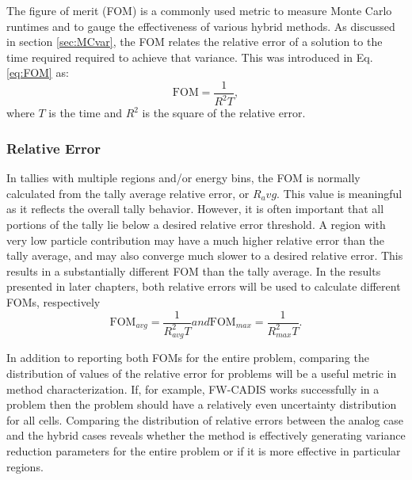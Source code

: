 The figure of merit (FOM) is a commonly used metric to measure Monte Carlo
runtimes and to gauge the effectiveness of various hybrid methods. As discussed
in section \ref{sec:MCvar}, the FOM relates the relative error of a solution to the
time required required to achieve that variance. This was introduced in Eq.
\ref{eq:FOM} as:
\begin{equation*}
  \text{FOM} = \frac{1}{R^{2}T} ,
\end{equation*}
where $T$ is the time and $R^{2}$ is the square of the relative error.

\subsubsection{Relative Error}

In tallies with multiple regions and/or energy bins, the FOM is normally calculated
from the tally average relative error, or $R_avg$. This value is meaningful as
it reflects the overall tally behavior. However, it is often important that all
portions of the tally lie below a desired relative error threshold. A region
with very low particle contribution may have a much higher relative error than
the tally average, and may also converge much slower to a desired relative
error. This results in a substantially different FOM than
the tally average. In the results presented in later chapters, both relative
errors will be used to calculate different FOMs, respectively
\begin{subequations}
  \begin{equation}
    \text{FOM}_{avg} = \frac{1}{R_{avg}^{2}T}
  \label{eq:FOMavg}
  \end{equation}
and
  \begin{equation}
    \text{FOM}_{max} = \frac{1}{R_{max}^{2}T} .
  \label{eq:FOMmax}
  \end{equation}
  \label{eq:FOMerror}
\end{subequations}

In addition to reporting both FOMs for the entire problem, comparing the
distribution of values of the relative error for problems will be a useful
metric in method characterization. If, for example, FW-CADIS works successfully
in a problem then the problem should have a relatively even uncertainty
distribution for all cells. Comparing the distribution of relative errors
between the analog case and the hybrid cases reveals whether the method is
effectively generating variance reduction parameters for the entire problem or
if it is more effective in particular regions.

